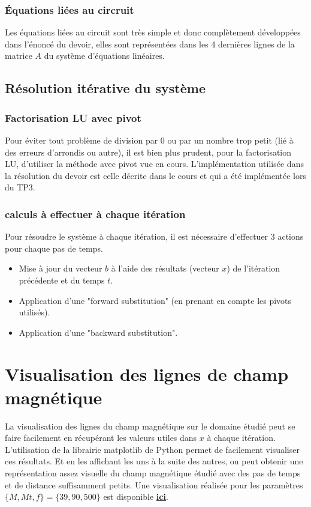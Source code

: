 \documentclass[11pt]{article}
\begin{document}
\subsubsection{Équations liées au circruit}
Les équations liées au circuit sont très simple et donc complètement développées dans l'énoncé du devoir, elles sont représentées dans les 4 dernières lignes de la matrice $A$ du système d'équations linéaires.


\subsection{Résolution itérative du système}

\subsubsection{Factorisation LU avec pivot}

Pour éviter tout problème de division par $0$ ou par un nombre trop petit (lié à des erreurs d'arrondis ou autre), il est bien plus prudent, pour la factorisation LU, d'utiliser la méthode avec pivot vue en cours. L'implémentation utilisée dans la résolution du devoir est celle décrite dans le cours et qui a été implémentée lors du TP3.

\subsubsection{calculs à effectuer à chaque itération}

Pour résoudre le système à chaque itération, il est nécessaire d'effectuer 3 actions pour chaque pas de temps.
\begin{itemize}
    \item Mise à jour du vecteur $b$ à l'aide des résultats (vecteur $x$) de l'itération précédente et du temps $t$.
    \item Application d'une "forward substitution" (en prenant en compte les pivots utilisés).
    \item Application d'une "backward substitution".
    
\end{itemize}

\section{Visualisation des lignes de champ magnétique}

La visualisation des lignes du champ magnétique sur le domaine étudié peut se faire facilement en récupérant les valeurs utiles dans $x$ à chaque itération. L'utilisation de la librairie matplotlib de Python permet de facilement visualiser ces résultats. Et en les affichant les uns à la suite des autres, on peut obtenir une représentation assez visuelle du champ magnétique étudié avec des pas de temps et de distance suffisamment petits. Une visualisation réalisée pour les paramètres $\{M,Mt,f\} = \{39,90,500\}$ est disponible \href{https://youtu.be/3ytU4as6qUQ}{\textbf{ici}}.
\end{document}
